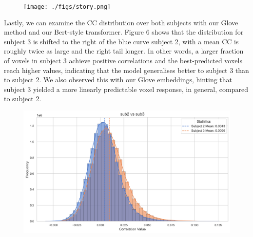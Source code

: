 \documentclass{article}
\begin{document}
\begin{figure}[H]
\centering
\captionsetup{width=\textwidth}
\texttt{[image: ./figs/story.png]}
\label{story}
\end{figure}

Lastly, we can examine the CC distribution over both subjects with our Glove method and our Bert-style transformer. Figure 6 shows that the distribution for subject 3 is shifted to the right of the blue curve subject 2, with a mean CC is roughly twice as large and the right tail longer. In other words, a larger fraction of voxels in subject 3 achieve positive correlations and the best-predicted voxels reach higher values, indicating that the model generalises better to subject 3 than to subject 2. We also observed this with our Glove embeddings, hinting that subject 3 yielded a more linearly predictable voxel response, in general, compared to subject 2. 

\begin{figure}[H]
\centering
\captionsetup{width=\textwidth}
\includegraphics[width=1\textwidth]{./figs/comparing_both_subjects.png}
\label{subjects}
\end{figure}
\end{document}
